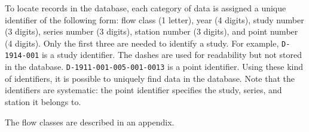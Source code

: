 To locate records in the database, each category of data is assigned a unique
identifier of the following form: flow class (1 letter), year (4 digits), study
number (3 digits), series number (3 digits), station number (3 digits), and
point number (4 digits).  Only the first three are needed to identify a study.
For example, \texttt{D-1914-001} is a study identifier.  The dashes are used
for readability but not stored in the database.
\texttt{D-1911-001-005-001-0013} is a point identifier.  Using these kind of
identifiers, it is possible to uniquely find data in the database.  Note that
the identifiers are systematic: the point identifier specifies the study,
series, and station it belongs to.

The flow classes are described in an appendix.


